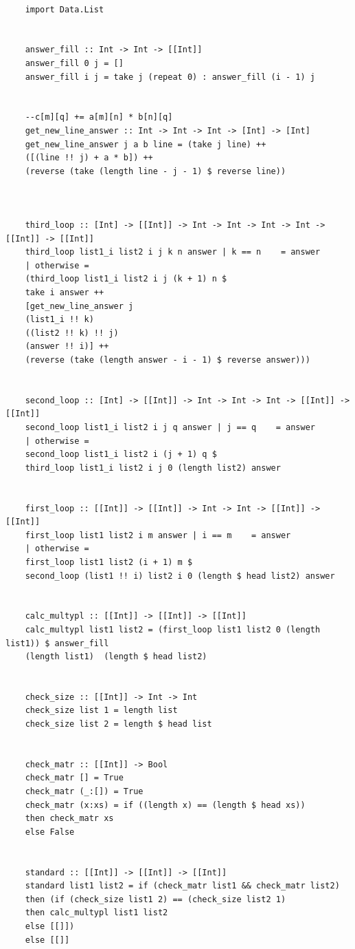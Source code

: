 \documentclass[12pt]{report}
\begin{document}
	\begin{lstlisting}[label=some-code1,caption=Стандартный алгоритм умножения матриц]
	
	import Data.List
	
	
	answer_fill :: Int -> Int -> [[Int]]
	answer_fill 0 j = []
	answer_fill i j = take j (repeat 0) : answer_fill (i - 1) j
	
	
	--c[m][q] += a[m][n] * b[n][q]
	get_new_line_answer :: Int -> Int -> Int -> [Int] -> [Int]
	get_new_line_answer j a b line = (take j line) ++ 
	([(line !! j) + a * b]) ++
	(reverse (take (length line - j - 1) $ reverse line))
	
	
	
	third_loop :: [Int] -> [[Int]] -> Int -> Int -> Int -> Int -> [[Int]] -> [[Int]]
	third_loop list1_i list2 i j k n answer | k == n    = answer
	| otherwise = 
	(third_loop list1_i list2 i j (k + 1) n $ 
	take i answer ++ 
	[get_new_line_answer j  
	(list1_i !! k)  
	((list2 !! k) !! j)
	(answer !! i)] ++ 
	(reverse (take (length answer - i - 1) $ reverse answer)))
	
	
	second_loop :: [Int] -> [[Int]] -> Int -> Int -> Int -> [[Int]] -> [[Int]]
	second_loop list1_i list2 i j q answer | j == q    = answer
	| otherwise = 
	second_loop list1_i list2 i (j + 1) q $
	third_loop list1_i list2 i j 0 (length list2) answer
	
	
	first_loop :: [[Int]] -> [[Int]] -> Int -> Int -> [[Int]] -> [[Int]]
	first_loop list1 list2 i m answer | i == m    = answer
	| otherwise = 
	first_loop list1 list2 (i + 1) m $
	second_loop (list1 !! i) list2 i 0 (length $ head list2) answer
	
	
	calc_multypl :: [[Int]] -> [[Int]] -> [[Int]]
	calc_multypl list1 list2 = (first_loop list1 list2 0 (length list1)) $ answer_fill
	(length list1)  (length $ head list2)
	
	
	check_size :: [[Int]] -> Int -> Int
	check_size list 1 = length list
	check_size list 2 = length $ head list
	
	
	check_matr :: [[Int]] -> Bool
	check_matr [] = True
	check_matr (_:[]) = True
	check_matr (x:xs) = if ((length x) == (length $ head xs))
	then check_matr xs
	else False
	
	
	standard :: [[Int]] -> [[Int]] -> [[Int]]
	standard list1 list2 = if (check_matr list1 && check_matr list2) 
	then (if (check_size list1 2) == (check_size list2 1)
	then calc_multypl list1 list2 
	else [[]])
	else [[]]
	\end{lstlisting}
	
\end{document}
